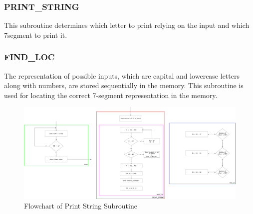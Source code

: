 \documentclass[titlepage]{article}
\begin{document}
	\subsubsection{PRINT\_STRING}
	This subroutine determines which letter to print relying on the input and which 7segment to print it.
	\subsubsection{FIND\_LOC}
	The representation of possible inputs, which are capital and lowercase letters along with numbers, are stored sequentially in the memory. This subroutine is used for locating the correct 7-segment representation in the memory.
	\begin{figure}[h]
		\centering
		\includegraphics[scale=.15]{../images/print_string.pdf}
		\caption{Flowchart of Print String Subroutine}
	\end{figure}
\end{document}

